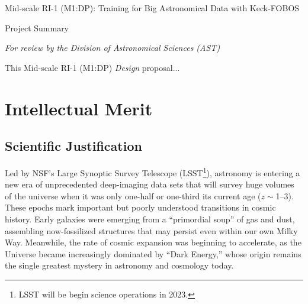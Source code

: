 \documentclass[oneside,11pt]{amsart}
\newcommand{\comment}[2][todo]{{\color{#1}[[{\bf #2}]]}}
\begin{document}


\vspace*{-1.5cm}

\centerline{\textsf {\Large Mid-scale RI-1 (M1:DP): Training for Big Astronomical Data with Keck-FOBOS}}
\centerline{\textsf {\large Project Summary}}
\centerline{\emph{{\small For review by the Division of Astronomical Sciences (AST)}}}


 This Mid-scale RI-1 (M1:DP) \emph{Design} proposal...



\clearpage
\section{Intellectual Merit}
\label{sec:im}

\subsection{Scientific Justification} 



Led by NSF's Large Synoptic Survey Telescope (LSST\footnote{LSST will be begin science operations in 2023.}), astronomy is entering a new era of unprecedented deep-imaging data
sets that will survey huge volumes of the universe when it was only one-half or one-third its current age ($z \sim
$1--3).  These epochs mark important but poorly understood transitions in cosmic history. Early galaxies were emerging
from a ``primordial soup'' of gas and dust, assembling now-fossilized structures that may persist even within our
own Milky Way.  Meanwhile, the rate of cosmic expansion was beginning to accelerate, as the Universe became
increasingly dominated by ``Dark Energy,'' whose origin remains the single greatest mystery in astronomy and cosmology
today.
\end{document}
